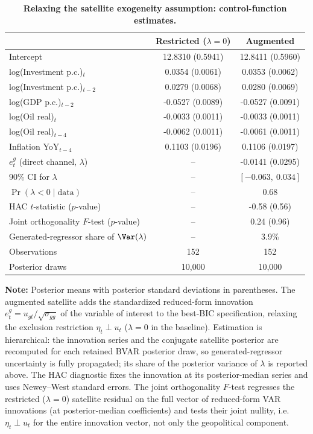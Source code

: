 \begin{table}[!htbp]
\centering
\scriptsize
\caption{\textbf{Relaxing the satellite exogeneity assumption: control-function estimates.}}
\label{tab:direct_channel_satellite}
\begin{tabular}{lcc}
\toprule
 & Restricted ($\lambda = 0$) & Augmented \\
\midrule
Intercept & 12.8310 (0.5941) & 12.8411 (0.5960) \\
log(Investment p.c.)$_{t}$ & 0.0354 (0.0061) & 0.0353 (0.0062) \\
log(Investment p.c.)$_{t-2}$ & 0.0279 (0.0068) & 0.0280 (0.0069) \\
log(GDP p.c.)$_{t-2}$ & -0.0527 (0.0089) & -0.0527 (0.0091) \\
log(Oil real)$_{t}$ & -0.0033 (0.0011) & -0.0033 (0.0011) \\
log(Oil real)$_{t-4}$ & -0.0062 (0.0011) & -0.0061 (0.0011) \\
Inflation YoY$_{t-4}$ & 0.1103 (0.0196) & 0.1106 (0.0197) \\
$e^{g}_{t}$ (direct channel, $\lambda$) & -- & -0.0141 (0.0295) \\
\midrule
90\% CI for $\lambda$ & -- & $[-0.063,\ 0.034]$ \\
$\Pr(\lambda < 0 \mid \text{data})$ & -- & 0.68 \\
HAC $t$-statistic ($p$-value) & -- & -0.58 (0.56) \\
Joint orthogonality $F$-test ($p$-value) & -- & 0.24 (0.96) \\
Generated-regressor share of $\Var(\lambda)$ & -- & 3.9\% \\
Observations & 152 & 152 \\
Posterior draws & 10{,}000 & 10{,}000 \\
\bottomrule
\end{tabular}
\par\medskip
\begin{minipage}{0.92\textwidth}
\footnotesize
\textbf{Note:} Posterior means with posterior standard deviations in
parentheses. The augmented satellite adds the standardized reduced-form
innovation $e^{g}_t=u_{gt}/\sqrt{\sigma_{gg}}$ of the variable of interest to
the best-BIC specification, relaxing the exclusion restriction $\eta_t\perp u_t$
($\lambda=0$ in the baseline). Estimation is hierarchical: the innovation series
and the conjugate satellite posterior are recomputed for each retained BVAR
posterior draw, so generated-regressor uncertainty is fully propagated; its
share of the posterior variance of $\lambda$ is reported above. The HAC
diagnostic fixes the innovation at its posterior-median series and uses
Newey--West standard errors. The joint orthogonality $F$-test regresses the
restricted ($\lambda=0$) satellite residual on the full vector of reduced-form
VAR innovations (at posterior-median coefficients) and tests their joint
nullity, i.e.\ $\eta_t\perp u_t$ for the entire innovation vector, not only the
geopolitical component.
\end{minipage}
\end{table}

